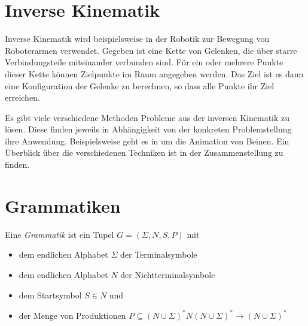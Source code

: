 

\section{Inverse Kinematik}
\label{IK}

Inverse Kinematik wird beispielsweise in der Robotik zur Bewegung von Roboterarmen verwendet. Gegeben ist eine Kette von Gelenken, die über starre Verbindungsteile miteinander verbunden sind. Für ein oder mehrere Punkte dieser Kette können Zielpunkte im Raum angegeben werden. Das Ziel ist es dann eine Konfiguration der Gelenke zu berechnen, so dass alle Punkte ihr Ziel erreichen.

Es gibt viele verschiedene Methoden Probleme aus der inversen Kinematik zu lösen. Diese finden jeweils in Abhängigkeit von der konkreten Problemstellung ihre Anwendung. Beispielsweise geht es in \cite{IKLegs} um die Animation von Beinen. Ein Überblick über die verschiedenen Techniken ist in der Zusammenstellung \cite{IKSurvey} zu finden.



\section{Grammatiken}
\label{grammars}

Eine \emph{Grammatik} ist ein Tupel $G = (\Sigma, N, S, P)$ mit 
\begin{itemize}
 \item dem endlichen Alphabet $\Sigma$ der Terminalsymbole
 \item dem endlichen Alphabet $N$ der Nichtterminalsymbole
 \item dem Startsymbol $S \in N$ und
 \item der Menge von Produktionen $P \subseteq (N \cup \Sigma)^* N (N \cup \Sigma)^* \rightarrow (N \cup \Sigma)^*$
\end{itemize}

